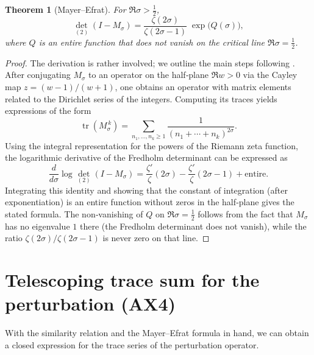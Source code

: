\documentclass[11pt,a4paper]{article}
\newtheorem{theorem}{Theorem}[section]
\theoremstyle{definition}
\theoremstyle{remark}
\newcommand{\MOp}{M}
\newcommand{\tr}{\operatorname{tr}}
\newcommand{\Det}{\operatorname{det}}
\begin{document}
\begin{theorem}[Mayer–Efrat]\label{thm:ME}
For \(\Re\sigma > \frac12\),
\[
{\Det}_{(2)}(I - \MOp_\sigma) = \frac{\zeta(2\sigma)}{\zeta(2\sigma-1)}\; \exp\bigl(Q(\sigma)\bigr),
\]
where \(Q\) is an \emph{entire} function that does \emph{not} vanish on the critical line \(\Re\sigma = \frac12\).
\end{theorem}
\begin{proof}
The derivation is rather involved; we outline the main steps following \cite{Mayer, Efrat}.
After conjugating \(\MOp_\sigma\) to an operator on the half‑plane \(\Re w>0\) via the Cayley map \(z=(w-1)/(w+1)\), one obtains an operator with matrix elements related to the Dirichlet series of the integers. Computing its traces yields expressions of the form
\[
\tr(\MOp_\sigma^{\,k}) = \sum_{n_1,\dots,n_k\ge 1} \frac{1}{(n_1+\cdots+n_k)^{2\sigma}} .
\]
Using the integral representation for the powers of the Riemann zeta function, the logarithmic derivative of the Fredholm determinant can be expressed as
\[
\frac{d}{d\sigma}\log{\Det}_{(2)}(I - \MOp_\sigma) = \frac{\zeta'}{\zeta}(2\sigma) - \frac{\zeta'}{\zeta}(2\sigma-1) + \text{entire}.
\]
Integrating this identity and showing that the constant of integration (after exponentiation) is an entire function without zeros in the half‑plane gives the stated formula. The non‑vanishing of \(Q\) on \(\Re\sigma=\frac12\) follows from the fact that \(\MOp_\sigma\) has no eigenvalue \(1\) there (the Fredholm determinant does not vanish), while the ratio \(\zeta(2\sigma)/\zeta(2\sigma-1)\) is never zero on that line.
\end{proof}

\section{Telescoping trace sum for the perturbation (AX4)}\label{sec:tele}

With the similarity relation and the Mayer–Efrat formula in hand, we can obtain a closed expression for the trace series of the perturbation operator.
\end{document}

